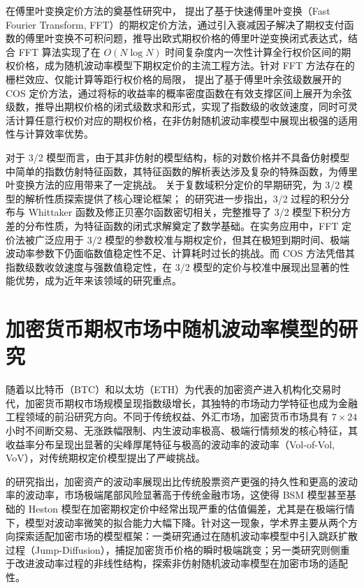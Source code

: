 在傅里叶变换定价方法的奠基性研究中，\citet{carrOptionValuationUsing1999} 提出了基于快速傅里叶变换（Fast Fourier Transform, FFT）的期权定价方法，通过引入衰减因子解决了期权支付函数的傅里叶变换不可积问题，推导出欧式期权价格的傅里叶逆变换闭式表达式，结合 FFT 算法实现了在 $O(N \log N)$ 时间复杂度内一次性计算全行权价区间的期权价格，成为随机波动率模型下期权定价的主流工程方法。针对 FFT 方法存在的栅栏效应、仅能计算等距行权价格的局限，\citet{fangNovelPricingMethod2009} 提出了基于傅里叶余弦级数展开的 COS 定价方法，通过将标的收益率的概率密度函数在有效支撑区间上展开为余弦级数，推导出期权价格的闭式级数求和形式，实现了指数级的收敛速度，同时可灵活计算任意行权价对应的期权价格，在非仿射随机波动率模型中展现出极强的适用性与计算效率优势。

对于 3/2 模型而言，由于其非仿射的模型结构，标的对数价格并不具备仿射模型中简单的指数仿射特征函数，其特征函数的解析表达涉及复杂的特殊函数，为傅里叶变换方法的应用带来了一定挑战。\citet{lewisOptionValuationStochastic2000} 关于复数域积分定价的早期研究，为 3/2 模型的解析性质探索提供了核心理论框架；\citet{dufresne2001integrated} 的研究进一步指出，3/2 过程的积分分布与 Whittaker 函数及修正贝塞尔函数密切相关，完整推导了 3/2 模型下积分方差的分布性质，为特征函数的闭式求解奠定了数学基础。在实务应用中，FFT 定价法被广泛应用于 3/2 模型的参数校准与期权定价，但其在极短到期时间、极端波动率参数下仍面临数值稳定性不足、计算耗时过长的挑战\citet{drimusOptionsRealizedVariance2011}。而 COS 方法凭借其指数级数收敛速度与强数值稳定性，在 3/2 模型的定价与校准中展现出显著的性能优势，成为近年来该领域的研究重点。

\section{加密货币期权市场中随机波动率模型的研究}

随着以比特币（BTC）和以太坊（ETH）为代表的加密资产进入机构化交易时代，加密货币期权市场规模呈现指数级增长，其独特的市场动力学特征也成为金融工程领域的前沿研究方向。不同于传统权益、外汇市场，加密货币市场具有 $7\times24$ 小时不间断交易、无涨跌幅限制、内生波动率极高、极端行情频发的核心特征，其收益率分布呈现出显著的尖峰厚尾特征与极高的波动率的波动率（Vol-of-Vol, VoV），对传统期权定价模型提出了严峻挑战。

\citet{houPricingCryptocurrencyOptions2020}的研究指出，加密资产的波动率展现出比传统股票资产更强的持久性和更高的波动率的波动率，市场极端尾部风险显著高于传统金融市场，这使得 BSM 模型甚至基础的 Heston 模型在加密期权定价中经常出现严重的估值偏差，尤其是在极端行情下，模型对波动率微笑的拟合能力大幅下降。针对这一现象，学术界主要从两个方向探索适配加密市场的模型框架：一类研究通过在随机波动率模型中引入跳跃扩散过程（Jump-Diffusion），捕捉加密货币价格的瞬时极端跳变\citet{scaillet2020high}；另一类研究则侧重于改进波动率过程的非线性结构，探索非仿射随机波动率模型在加密市场的适配性。

